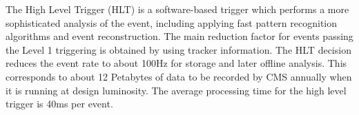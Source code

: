The High Level Trigger (HLT) is a software-based trigger which performs a more sophisticated analysis of the event, including applying fast pattern recognition algorithms and event reconstruction. 
The main reduction factor for events passing the Level 1 triggering is obtained by using tracker information. 
The HLT decision reduces the event rate to about 100Hz for storage and later offline analysis. 
This corresponds to about 12 Petabytes of data to be recorded by CMS annually when it is running at design luminosity. 
The average processing time for the high level trigger is 40ms per event.
